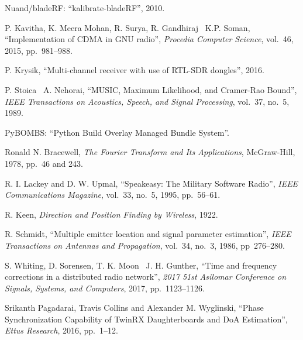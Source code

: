 \documentclass[a4paper,12pt,oneside]{book}%
\begin{document}
\begin{thebibliography}{xx}
	{Nuand/bladeRF: ``kalibrate-bladeRF''}, 2010.
	
	P. Kavitha, K. Meera Mohan, R. Surya, R. Gandhiraj \harvardand\ K.P. Soman, {``Implementation of CDMA in GNU radio''}, {\em Procedia Computer Science}, vol.~46, 2015, pp.~981--988.
	
	P. Krysik, ``{Multi-channel receiver with use of RTL-SDR dongles}'', 2016.
	
	P. Stoica \harvardand\ A. Nehorai,
	``{MUSIC, Maximum Likelihood, and Cramer-Rao Bound}'', {\em IEEE Transactions
		on Acoustics, Speech, and Signal Processing}, {vol.~37}, no.~5, 1989.
	
	PyBOMBS: ``Python Build Overlay Managed Bundle System''.
	
	Ronald N. Bracewell, {\em {The Fourier Transform and Its Applications}}, McGraw-Hill, 1978, pp.~46 and 243.
	
	{R. I. Lackey and D. W. Upmal},
	``{Speakeasy: The Military Software Radio}'', {\em IEEE Communications
		Magazine}, {vol.~33}, no.~5, 1995, pp.~56--61.
	
	R. Keen, {\em {Direction and Position Finding by Wireless}}, 1922.
	
	R. Schmidt, ``{Multiple emitter
		location and signal parameter estimation}'', {\em IEEE Transactions on Antennas and Propagation}, vol.~34, no.~3, 1986, pp~276--280.
	
	S. Whiting, D. Sorensen, T. K. Moon \harvardand\ J. H. Gunther,
	 ``{Time and frequency corrections in
		a distributed radio network}'', {\em 2017 51st Asilomar Conference on Signals, Systems, and Computers}, 2017, pp.~1123--1126.
	
	 Srikanth Pagadarai, Travis Collins and Alexander M. Wyglinski, ``{Phase
		Synchronization Capability of TwinRX Daughterboards and DoA Estimation}'', {\em Ettus Research}, 2016, pp.~1--12.
	
\end{thebibliography}

%
%

\end{document}
